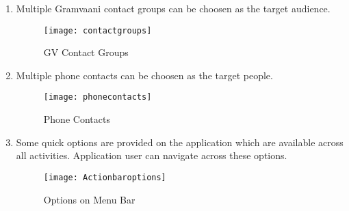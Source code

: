 \begin {enumerate}
\item Multiple Gramvaani contact groups can be choosen as the target audience.
\begin{figure}[H]
\begin{center}   
\texttt{[image: contactgroups]}
\caption{GV Contact Groups}
\label{fig:contactgroups}
\end{center}
\end{figure}

\item Multiple phone contacts can be choosen as the target people.
\begin{figure}[H]
\begin{center}   
\texttt{[image: phonecontacts]}
\caption{Phone Contacts}
\label{fig:phonecontacts}
\end{center}
\end{figure}

\item Some quick options are provided on the application which are available across all activities. Application  user can navigate across these options.
\begin{figure}[H]
\begin{center}   
\texttt{[image: Actionbaroptions]}
\caption{Options on Menu Bar}
\label{fig:menubar}
\end{center}
\end{figure}

\end{enumerate}




